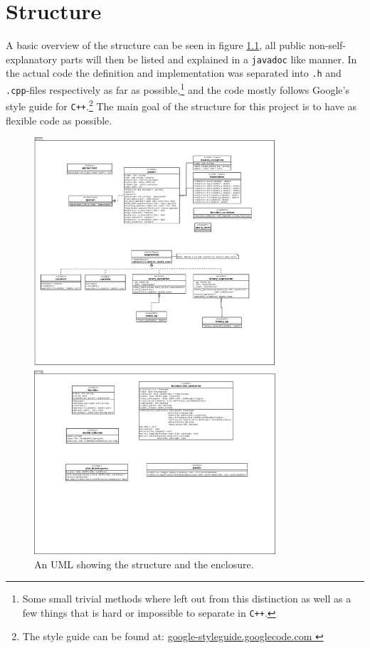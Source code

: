 \documentclass[a4paper,11pt]{kth-mag}
\newcommand{\Cpp}{\texttt{C++}}
\begin{document}
\chapter{Structure}
A basic overview of the structure can be seen in figure \ref{fig:UML}, all
public non-self-explanatory parts will then be listed and explained in 
a \verb+javadoc+ like manner. In the actual code the definition and
implementation was separated into \texttt{.h} and \texttt{.cpp}-files
respectively as far as possible,\footnote{Some small trivial methods where
left out from this distinction as well as a few things that is hard or
impossible to separate in \Cpp.} and the code mostly follows Google's
style guide for \Cpp.\footnote{The style guide can be found at:
\href{
    http://google-styleguide.googlecode.com/svn/trunk/cppguide.xml
    }{
    google-styleguide.googlecode.com
    }
} 
The main goal of the structure for this project is to have as flexible code as possible.
\begin{figure}[H]
\begin{center}
    \includegraphics[width=0.8\textwidth]{uml.pdf}
    \caption{\small{An UML showing the structure and the enclosure.}}\label{fig:UML}
\end{center}
\end{figure}
\end{document}
